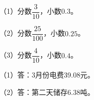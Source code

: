 
\begingroup\color{answerred}\noindent（1）分数$\dfrac3{10}$，小数$0.3$。\par
\noindent（2）分数$\dfrac{25}{100}$，小数$0.25$。\par
\noindent（3）分数$\dfrac4{10}$，小数$0.4$。\par\par\endgroup
{}
\begingroup\color{answerred}\par\endgroup
{}
\begingroup\color{answerred}\noindent（1）答：3月份电费39.08元。\par
\noindent（2）答：第二天储存6.38吨。\par\par\endgroup
